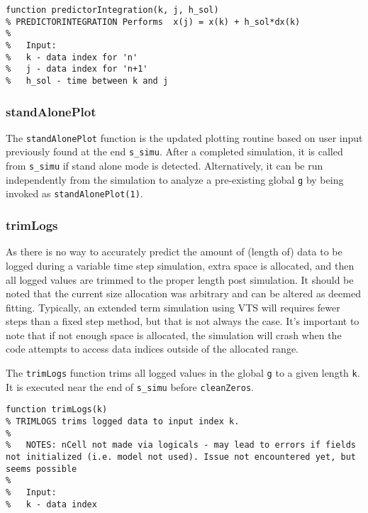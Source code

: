 \begin{verbatim}
function predictorIntegration(k, j, h_sol)
% PREDICTORINTEGRATION Performs  x(j) = x(k) + h_sol*dx(k)
%
%   Input:
%   k - data index for 'n'
%   j - data index for 'n+1'
%   h_sol - time between k and j
\end{verbatim}


\subsubsection{standAlonePlot}  
The \verb|standAlonePlot| function is the updated plotting routine based on user input previously found at the end \verb|s_simu|.
After a completed simulation, it is called from \verb|s_simu| if stand alone mode is detected.
Alternatively, it can be run independently from the simulation to analyze a pre-existing global \verb|g| by being invoked as \verb|standAlonePlot(1)|.

\subsubsection{trimLogs}  
As there is no way to accurately predict the amount of (length of) data to be logged during a variable time step simulation, extra space is allocated, and then all logged values are trimmed to the proper length post simulation.
It should be noted that the current size allocation was arbitrary and can be altered as deemed fitting.
Typically, an extended term simulation using VTS will requires fewer steps than a fixed step method, but that is not always the case.
It's important to note that if not enough space is allocated, the simulation will crash when the code attempts to access data indices outside of the allocated range.

The \verb|trimLogs| function trims all logged values in the global \verb|g| to a given length \verb|k|.
It is executed near the end of \verb|s_simu| before \verb|cleanZeros|.


\begin{verbatim}
function trimLogs(k)
% TRIMLOGS trims logged data to input index k.
%
%   NOTES: nCell not made via logicals - may lead to errors if fields not initialized (i.e. model not used). Issue not encountered yet, but seems possible
%
%   Input:
%   k - data index
\end{verbatim} 
